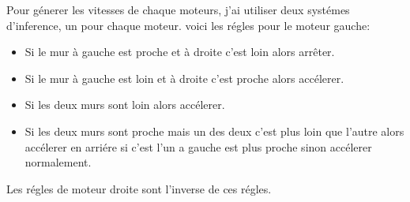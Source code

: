 \documentclass{article}
\begin{document}
Pour génerer les vitesses de chaque moteurs, j'ai utiliser deux systémes
d'inference, un pour chaque moteur. voici les régles pour le moteur gauche:
\begin{itemize}
   \item Si le mur à gauche est proche et à droite c'est loin alors arrêter.
   \item Si le mur à gauche est loin et à droite c'est proche alors accélerer.
   \item Si les deux murs sont loin alors accélerer.
   \item Si les deux murs sont proche mais un des deux c'est plus loin que
      l'autre alors accélerer en arriére si c'est l'un a gauche est plus proche
      sinon accélerer normalement.
\end{itemize}

Les régles de moteur droite sont l'inverse de ces régles.
\end{document}

